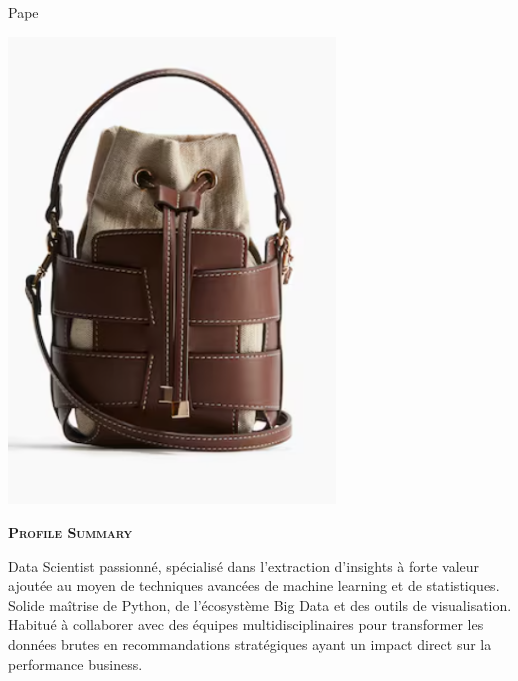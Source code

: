 \documentclass[11pt,a4paper]{article}
\newcommand{\headleft}[1]{\vspace*{3ex}\textsc{\textbf{#1}}\par%
    \vspace*{-1.5ex}\hrulefill\par\vspace*{0.7ex}}
\begin{document}
\setlength{\topskip}{0pt}\setlength{\parindent}{0pt}\setlength{\parskip}{0pt}
\setlength{\fboxsep}{0pt}\pagestyle{empty}\raggedbottom

\begin{minipage}[t]{0.33\textwidth}
\colorbox{cvblue}{\begin{minipage}[t][5mm][t]{\textwidth}\null\hfill\null\end{minipage}}
\vspace{-.2ex}
\colorbox{cvblue!90}{\color{white}
\textwidth
\begin{minipage}[t][293mm][t]{0.82\textwidth}\raggedright
\vspace*{2.5ex}

\Large Pape \textbf{\textscFALL} \normalsize


\null\hfill\includegraphics[width=0.65\textwidth]{ e220def131b24fc4ac090891810a719b.png }\hfill\null


\vspace*{0.5ex}

\headleft{Profile Summary}
Data Scientist passionné, spécialisé dans l’extraction d’insights à forte valeur ajoutée au moyen de techniques avancées de machine learning et de statistiques. Solide maîtrise de Python, de l’écosystème Big Data et des outils de visualisation. Habitué à collaborer avec des équipes multidisciplinaires pour transformer les données brutes en recommandations stratégiques ayant un impact direct sur la performance business.


\end{minipage}}
\end{minipage}
\end{document}
